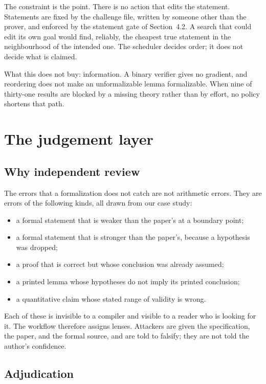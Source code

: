 \documentclass[11pt]{article}
\begin{document}
The constraint is the point. There is no action that edits the statement.
Statements are fixed by the challenge file, written by someone other than the
prover, and enforced by the statement gate of Section~4.2. A search that could
edit its own goal would find, reliably, the cheapest true statement in the
neighbourhood of the intended one. The scheduler decides order; it does not
decide what is claimed.

What this does not buy: information. A binary verifier gives no gradient, and
reordering does not make an unformalizable lemma formalizable. When nine of
thirty-one results are blocked by a missing theory rather than by effort, no
policy shortens that path.

\section{The judgement layer}

\subsection{Why independent review}

The errors that a formalization does not catch are not arithmetic errors. They
are errors of the following kinds, all drawn from our case study:

\begin{itemize}
\item a formal statement that is weaker than the paper's at a boundary point;
\item a formal statement that is stronger than the paper's, because a
  hypothesis was dropped;
\item a proof that is correct but whose conclusion was already assumed;
\item a printed lemma whose hypotheses do not imply its printed conclusion;
\item a quantitative claim whose stated range of validity is wrong.
\end{itemize}

Each of these is invisible to a compiler and visible to a reader who is
looking for it. The workflow therefore assigns lenses. Attackers are given the
specification, the paper, and the formal source, and are told to falsify; they
are not told the author's confidence.

\subsection{Adjudication}
\end{document}
